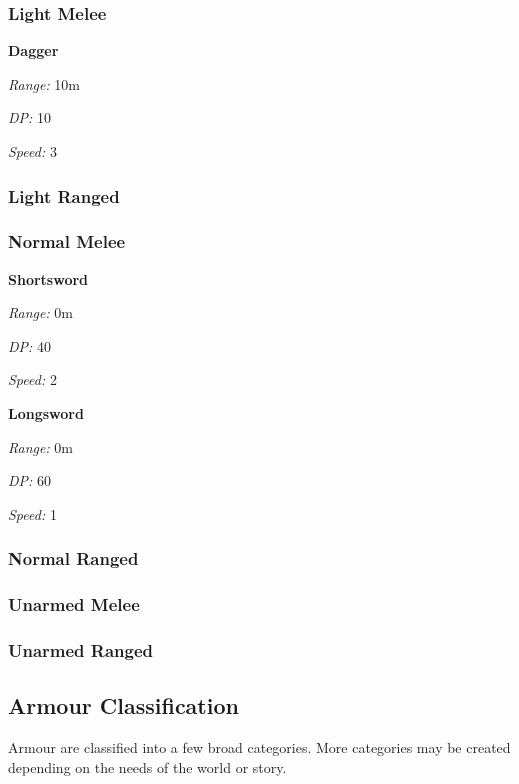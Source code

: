 \documentclass[12pt,]{article}
\begin{document}
\subsubsection{Light Melee}\label{light-melee}

\textbf{Dagger}

\emph{Range:} 10m

\emph{DP:} 10

\emph{Speed:} 3

\subsubsection{Light Ranged}\label{light-ranged}

\subsubsection{Normal Melee}\label{normal-melee}

\textbf{Shortsword}

\emph{Range:} 0m

\emph{DP:} 40

\emph{Speed:} 2

\textbf{Longsword}

\emph{Range:} 0m

\emph{DP:} 60

\emph{Speed:} 1

\subsubsection{Normal Ranged}\label{normal-ranged}

\subsubsection{Unarmed Melee}\label{unarmed-melee}

\subsubsection{Unarmed Ranged}\label{unarmed-ranged}

\subsection{Armour Classification}\label{armour-classification}

Armour are classified into a few broad categories. More categories may
be created depending on the needs of the world or story.
\end{document}
